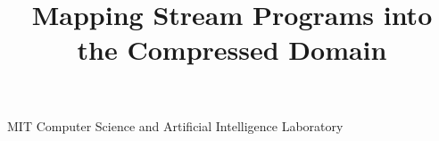 \documentclass[preprint,nocopyrightspace]{sigplanconf}
\begin{document}


\title{Mapping Stream Programs into the Compressed Domain}


           {MIT Computer Science and Artificial Intelligence Laboratory}

\maketitle

\begin{abstract}

\end{abstract}







%


%

%


\end{document}
